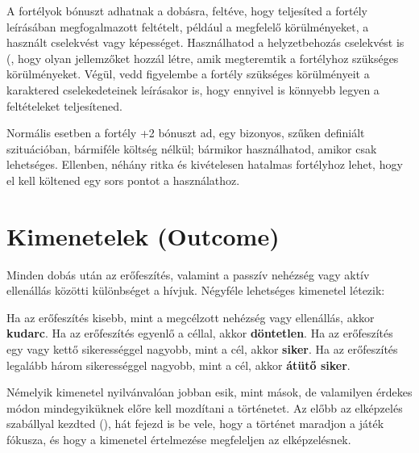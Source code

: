 A fortélyok bónuszt adhatnak a dobásra, feltéve, hogy teljesíted a fortély leírásában megfogalmazott feltételt, például a megfelelő körülményeket, a használt cselekvést vagy képességet. Használhatod a helyzetbehozás cselekvést is (, hogy olyan jellemzőket hozzál létre, amik megteremtik a fortélyhoz szükséges körülményeket. Végül, vedd figyelembe a fortély szükséges körülményeit a karaktered cselekedeteinek leírásakor is, hogy ennyivel is könnyebb legyen a feltételeket teljesítened.

Normális esetben a fortély +2 bónuszt ad, egy bizonyos, szűken definiált szituációban, bármiféle költség nélkül; bármikor használhatod, amikor csak lehetséges. Ellenben, néhány ritka és kivételesen hatalmas fortélyhoz lehet, hogy el kell költened egy sors pontot a használathoz.

\section[Kimenetelek]{Kimenetelek (Outcome)}

Minden dobás után az erőfeszítés, valamint a passzív nehézség vagy aktív ellenállás közötti különbséget a  hívjuk. Négyféle lehetséges kimenetel létezik:

\begin{itemize}
    \failureitem Ha az erőfeszítés kisebb, mint a megcélzott nehézség vagy ellenállás, akkor \textbf{kudarc}.
    \tieitem Ha az erőfeszítés egyenlő a céllal, akkor \textbf{döntetlen}.
    \successitem Ha az erőfeszítés egy vagy kettő sikerességgel nagyobb, mint a cél, akkor \textbf{siker}.
    \successwithstyleitem Ha az erőfeszítés legalább három sikerességgel nagyobb, mint a cél, akkor \textbf{átütő siker}.
\end{itemize}

Némelyik kimenetel nyilvánvalóan jobban esik, mint mások, de valamilyen érdekes módon mindegyiküknek előre kell mozdítani a történetet. Az előbb az elképzelés szabállyal kezdted (), hát fejezd is be vele, hogy a történet maradjon a játék fókusza, és hogy a kimenetel értelmezése megfeleljen az elképzelésnek.


\newpage


